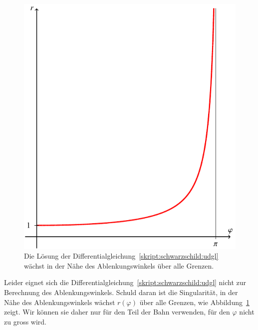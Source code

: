 \begin{figure}
\centering
\includegraphics{chapters/tikz/lichtablenkung.pdf}
\caption{Die Lösung der Differentialgleichung~\eqref{skript:schwarzschild:udgl}
wächst in der Nähe des Ablenkungswinkels über alle Grenzen.
\label{skript:schwarzschild:abbildung:rphi}}
\end{figure}
Leider eignet sich die Differentialgleichung~\eqref{skript:schwarzschild:udgl}
nicht zur Berechnung des Ablenkungswinkels.
Schuld daran ist die Singularität, in der Nähe des Ablenkungswinkels
wächst $r(\varphi)$ über alle Grenzen, wie
Abbildung~\ref{skript:schwarzschild:abbildung:rphi} zeigt.
Wir können sie daher nur für den Teil der Bahn verwenden, für den
$\varphi$ nicht zu gross wird.

